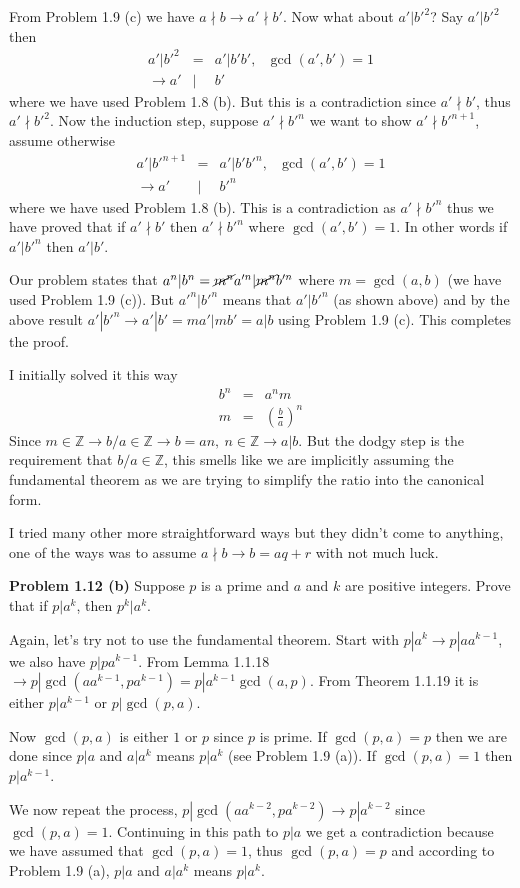 \documentclass[aps,preprint,preprintnumbers,nofootinbib,showpacs,prd]{revtex4-1}
\newcommand{\nbea}{\begin{eqnarray*}}
\newcommand{\neea}{\end{eqnarray*}}
\begin{document}
From Problem 1.9 (c) we have $a \nmid b \to a' \nmid b'$. Now what about $a'|b'^2$? Say $a' | b'^2$ then
%
\nbea
a'|b'^2 & = & a' | b' b', ~~~\gcd(a',b') = 1 \\
\to a' & | & b'
\neea
%
where we have used Problem 1.8 (b). But this is a contradiction since $a' \nmid b'$, thus $a' \nmid b'^2$. Now the induction step, suppose $a' \nmid b'^n$ we want to show $a' \nmid b'^{n+1}$, assume otherwise
%
\nbea
a'|b'^{n+1} & = & a' | b' b'^n, ~~~\gcd(a',b') = 1 \\
\to a' & | & b'^n
\neea
%
where we have used Problem 1.8 (b). This is a contradiction as $a' \nmid b'^n$ thus we have proved that if $a' \nmid b'$ then $a' \nmid b'^n$ where $\gcd(a',b')=1$. In other words if $a' | b'^n$ then $a' | b'$.

Our problem states that $a^n | b^n = \cancel{m^n} a'^n | \cancel{m^n} b'^n$ where $m = \gcd(a,b)$ (we have used Problem 1.9 (c)). But $a'^n | b'^n$ means that $a' | b'^n$ (as shown above) and by the above result $a' | b'^n \to a'|b' = ma'|mb' = a|b$ using Problem 1.9 (c). This completes the proof.

I initially solved it this way
%
\nbea
b^n & = & a^n  m \\
m & = & \left(\frac{b}{a} \right)^n
\neea
%
Since $m \in \mathbb{Z} \to b/a \in \mathbb{Z} \to b = an,~n \in \mathbb{Z} \to a|b$. But the dodgy step is the requirement that $b/a \in \mathbb{Z}$, this smells like we are implicitly assuming the fundamental theorem as we are trying to simplify the ratio into the canonical form.

I tried many other more straightforward ways but they didn't come to anything, one of the ways was to assume $a \nmid b \to b = aq + r$ with not much luck.

{\bf Problem 1.12 (b)} Suppose $p$ is a prime and $a$ and $k$ are positive integers. Prove that if $p|a^k$, then $p^k|a^k$.

Again, let's try not to use the fundamental theorem. Start with $p|a^k \to p | a a^{k-1}$, we also have $p | p a^{k-1}$. From Lemma 1.1.18 $\to p|\gcd(a a^{k-1}, p a^{k-1}) = p|a^{k-1}\gcd(a,p)$. From Theorem 1.1.19 it is either $p|a^{k-1}$ or $p|\gcd(p,a)$.

Now $\gcd(p,a)$ is either $1$ or $p$ since $p$ is prime. If $\gcd(p,a) = p$ then we are done since $p|a$ and $a|a^k$ means $p|a^k$ (see Problem 1.9 (a)). If $\gcd(p,a) = 1$ then $p|a^{k-1}$.

We now repeat the process, $p|\gcd(a a^{k-2}, p a^{k-2}) \to p|a^{k-2}$ since $\gcd(p,a) = 1$. Continuing in this path to $p|a$ we get a contradiction because we have assumed that $\gcd(p,a) = 1$, thus  $\gcd(p,a) = p$ and according to Problem 1.9 (a), $p|a$ and $a|a^k$ means $p|a^k$.
\end{document}
